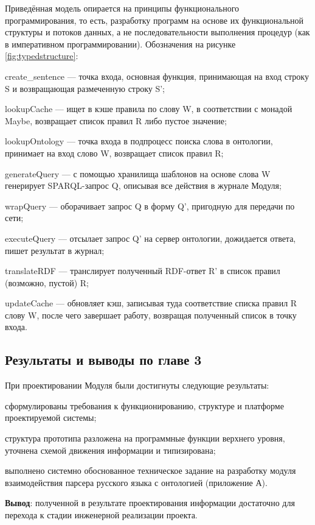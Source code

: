 Приведённая модель опирается на принципы функционального программирования, то есть, разработку программ на основе их функциональной структуры и потоков данных, а не последовательности выполнения процедур (как в императивном программировании). Обозначения на рисунке \ref{fig:typedstructure}:

\begin{list}{}{\leftmargin=1.5cm}
	\item create_sentence --- точка входа, основная функция, принимающая на вход строку S и возвращающая размеченную строку S';
	\item lookupCache --- ищет в кэше правила по слову W, в соответствии с монадой Maybe, возвращает список правил R либо пустое значение;
	\item lookupOntology --- точка входа в подпроцесс поиска слова в онтологии, принимает на вход слово W, возвращает список правил R;
	\item generateQuery --- с помощью хранилища шаблонов на основе слова W генерирует SPARQL-запрос Q, описывая все действия в журнале Модуля;
	\item wrapQuery --- оборачивает запрос Q в форму Q', пригодную для передачи по сети;
	\item executeQuery --- отсылает запрос Q' на сервер онтологии, дожидается ответа, пишет результат в журнал;
	\item translateRDF --- транслирует полученный RDF-ответ R' в список правил (возможно, пустой) R;
	\item updateCache --- обновляет кэш, записывая туда соответствие списка правил R слову W, после чего завершает работу, возвращая полученный список в точку входа.
\end{list}

\subsection{Результаты и выводы по главе 3}

При проектировании Модуля были достигнуты следующие результаты:
\begin{list}{}{\leftmargin=1.5cm}
	\item сформулированы требования к функционированию, структуре и платформе проектируемой системы;
	\item структура прототипа разложена на программные функции верхнего уровня, уточнена схемой движения информации и типизирована;
	\item выполнено системно обоснованное техническое задание на разработку модуля взаимодействия парсера русского языка с онтологией (приложение А).
\end{list}

\textbf{Вывод}: полученной в результате проектирования информации достаточно для перехода к стадии инженерной реализации проекта.